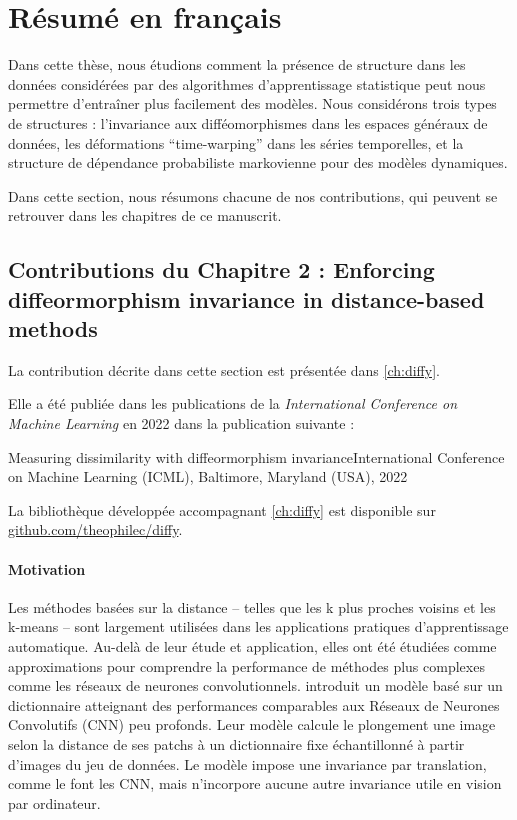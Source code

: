 \newpage\section{Résumé en français}

Dans cette thèse, nous étudions comment la présence de structure dans les données considérées par des algorithmes d'apprentissage statistique peut nous permettre d'entraîner plus facilement des modèles. Nous considérons trois types de structures : l'invariance aux difféomorphismes dans les espaces généraux de données, les déformations ``time-warping'' dans les séries temporelles, et la structure de dépendance probabiliste markovienne pour des modèles dynamiques.

Dans cette section, nous résumons chacune de nos contributions, qui peuvent se retrouver dans les chapitres de ce manuscrit.


\subsection{Contributions du Chapitre 2 : Enforcing diffeormorphism invariance in distance-based methods}
\begin{mdframed}
La contribution décrite dans cette section est présentée dans \cref{ch:diffy}.

\noindent Elle a été publiée dans les publications de la \emph{International Conference on Machine Learning} en 2022 dans la publication suivante :
\begin{mdframed}
{Measuring dissimilarity with diffeormorphism invariance}{International Conference on Machine Learning (ICML), Baltimore, Maryland (USA), 2022}
\end{mdframed}
La bibliothèque développée accompagnant \cref{ch:diffy} est disponible sur \url{github.com/theophilec/diffy}.
\end{mdframed}

\paragraph{Motivation}
Les méthodes basées sur la distance -- telles que les k plus proches voisins et les k-means -- sont largement utilisées dans les applications pratiques d'apprentissage automatique. Au-delà de leur étude et application, elles ont été étudiées comme approximations pour comprendre la performance de méthodes plus complexes comme les réseaux de neurones convolutionnels. \cite{thiry} introduit un modèle basé sur un dictionnaire atteignant des performances comparables aux Réseaux de Neurones Convolutifs (CNN) peu profonds. Leur modèle calcule le plongement une image selon la distance de ses patchs à un dictionnaire fixe échantillonné à partir d'images du jeu de données. Le modèle impose une invariance par translation, comme le font les CNN, mais n'incorpore aucune autre invariance utile en vision par ordinateur.

